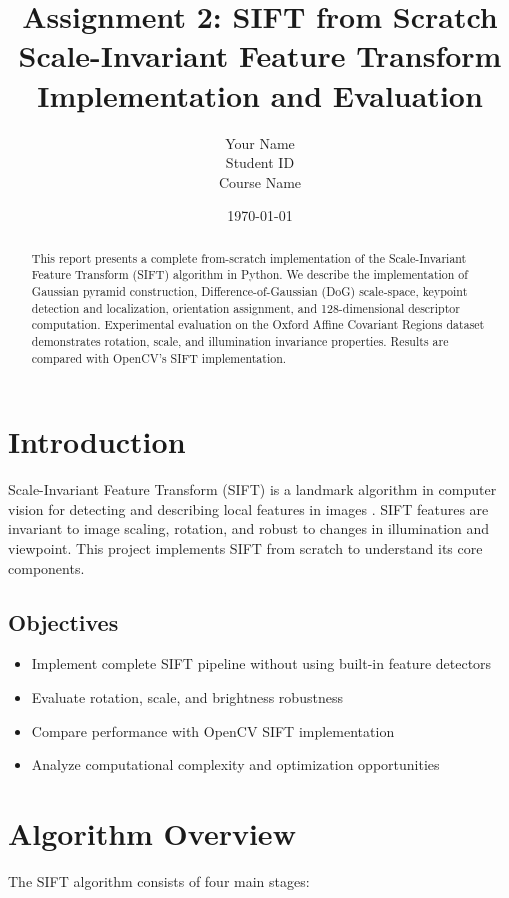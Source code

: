 \documentclass[11pt, a4paper]{article}
\title{\textbf{Assignment 2: SIFT from Scratch} \\
       \large Scale-Invariant Feature Transform Implementation and Evaluation}
\author{Your Name \\ Student ID \\ Course Name}
\date{\today}
\begin{document}
\maketitle

\begin{abstract}
This report presents a complete from-scratch implementation of the Scale-Invariant Feature Transform (SIFT) algorithm in Python. We describe the implementation of Gaussian pyramid construction, Difference-of-Gaussian (DoG) scale-space, keypoint detection and localization, orientation assignment, and 128-dimensional descriptor computation. Experimental evaluation on the Oxford Affine Covariant Regions dataset demonstrates rotation, scale, and illumination invariance properties. Results are compared with OpenCV's SIFT implementation.
\end{abstract}

\section{Introduction}

Scale-Invariant Feature Transform (SIFT) is a landmark algorithm in computer vision for detecting and describing local features in images \cite{lowe2004}. SIFT features are invariant to image scaling, rotation, and robust to changes in illumination and viewpoint. This project implements SIFT from scratch to understand its core components.

\subsection{Objectives}
\begin{itemize}
    \item Implement complete SIFT pipeline without using built-in feature detectors
    \item Evaluate rotation, scale, and brightness robustness
    \item Compare performance with OpenCV SIFT implementation
    \item Analyze computational complexity and optimization opportunities
\end{itemize}

\section{Algorithm Overview}

The SIFT algorithm consists of four main stages:
\end{document}

